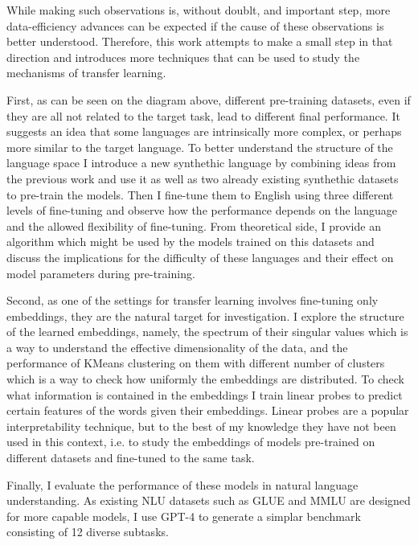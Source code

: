 \documentclass[a4paper, 11pt, oneside]{article}
\begin{document}
	While making such observations is, without doublt, and important step, more
	data-efficiency advances can be expected if the cause of these observations is
	better understood. Therefore, this work attempts to make a small step in that
	direction and introduces more techniques that can be used to study the
	mechanisms of transfer learning.

	First, as can be seen on the diagram above, different pre-training datasets, even
	if they are all not related to the target task, lead to different final
	performance. It suggests an idea that some languages are intrinsically more complex,
	or perhaps more similar to the target language. To better understand the structure
	of the language space I introduce a new synthethic language by combining ideas
	from the previous work and use it as well as two already existing synthethic datasets
	to pre-train the models. Then I fine-tune them to English using three
	different levels of fine-tuning and observe how the performance depends on the
	language and the allowed flexibility of fine-tuning. From theoretical side, I
	provide an algorithm which might be used by the models trained on this
	datasets and discuss the implications for the difficulty of these languages
	and their effect on model parameters during pre-training.

	Second, as one of the settings for transfer learning involves fine-tuning only
	embeddings, they are the natural target for investigation. I explore the structure
	of the learned embeddings, namely, the spectrum of their singular values which
	is a way to understand the effective dimensionality of the data, and the
	performance of KMeans clustering on them with different number of clusters
	which is a way to check how uniformly the embeddings are distributed. To check
	what information is contained in the embeddings I train linear probes to predict
	certain features of the words given their embeddings. Linear probes are a
	popular interpretability technique, but to the best of my knowledge they have not
	been used in this context, i.e. to study the embeddings of models pre-trained on
	different datasets and fine-tuned to the same task.

	Finally, I evaluate the performance of these models in natural language
	understanding. As existing NLU datasets such as GLUE \cite{wang2018glue} and MMLU
	\cite{hendrycks2020measuring} are designed for more capable models, I use GPT-4
	\cite{openai2023gpt4} to generate a simplar benchmark consisting of 12 diverse
	subtasks.
\end{document}
